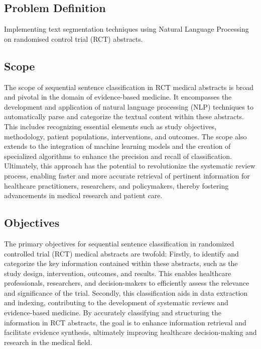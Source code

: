 \documentclass[12pt,a4paper]{report}     %
\begin{document}
\begin{normalsize}
{}

\newpage 
\chapter{}
{\setlength{\baselineskip}{1.1\baselineskip}
\section{Problem Definition}
Implementing text segmentation techniques using Natural Language Processing on randomised control trial (RCT) abstracts.
\section{Scope}
The scope of sequential sentence classification in RCT medical abstracts is broad and pivotal in the domain of evidence-based medicine. It encompasses the development and application of natural language processing (NLP) techniques to automatically parse and categorize the textual content within these abstracts. This includes recognizing essential elements such as study objectives, methodology, patient populations, interventions, and outcomes. The scope also extends to the integration of machine learning models and the creation of specialized algorithms to enhance the precision and recall of classification. Ultimately, this approach has the potential to revolutionize the systematic review process, enabling faster and more accurate retrieval of pertinent information for healthcare practitioners, researchers, and policymakers, thereby fostering advancements in medical research and patient care.
\section{Objectives}
The primary objectives for sequential sentence classification in randomized controlled trial (RCT) medical abstracts are twofold: Firstly, to identify and categorize the key information contained within these abstracts, such as the study design, intervention, outcomes, and results. This enables healthcare professionals, researchers, and decision-makers to efficiently assess the relevance and significance of the trial. Secondly, this classification aids in data extraction and indexing, contributing to the development of systematic reviews and evidence-based medicine. By accurately classifying and structuring the information in RCT abstracts, the goal is to enhance information retrieval and facilitate evidence synthesis, ultimately improving healthcare decision-making and research in the medical field.
}
\end{normalsize}
\end{document}

